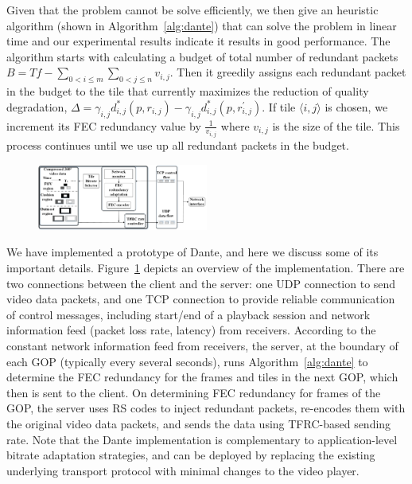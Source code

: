 Given that the problem cannot be solve efficiently, we then give 
an heuristic algorithm (shown in Algorithm~\ref{alg:dante}) that 
can solve the problem in linear time and our experimental results 
indicate it results in good performance. The algorithm starts 
with calculating a budget of total number of redundant packets 
$B=Tf-\sum_{0<i\leq m}\sum_{0<j\leq n}v_{i,j}$. Then it greedily assigns 
each redundant packet in the budget to the tile that currently 
maximizes the reduction of quality degradation, \ie 
$\Delta=\gamma_{i,j}d_{i,j}^{*}(p,r_{i,j})-\gamma_{i,j}d_{i,j}^{*}(p,r_{i,j}^{'})$. 
If tile $\langle i, j\rangle$ is chosen, we increment its FEC 
redundancy value by $\frac{1}{v_{i,j}}$ where $v_{i,j}$ is the 
size of the tile. This process continues until we use up all 
redundant packets in the budget.


\begin{figure}[t]
	\centering
	\includegraphics[width=0.5\textwidth]{paper_figs/architecture_dante_0626_v4.png}
	\vspace{-0.3cm}
	\label{fig:overview}
\end{figure}




\label{subsec:impl}


We have implemented a prototype of Dante, and here we discuss 
some of its important details. 
Figure~\ref{fig:overview} depicts an overview of the 
implementation. There are two connections between the client and 
the server: one UDP connection to send video data packets, and 
one TCP connection to provide reliable communication of control 
messages, including start/end of a playback session and network information feed (\eg packet loss rate, latency) from receivers. According to the constant network information feed from receivers, the server, at the boundary of each GOP (typically every several seconds), runs Algorithm~\ref{alg:dante} to determine the FEC 
redundancy for the frames and tiles in the next GOP, which then is sent to
 the client. On determining FEC redundancy for frames of the GOP, the server uses 
RS codes to 
inject redundant packets, re-encodes them with the original 
video data packets, and sends the data using TFRC-based sending 
rate. Note that the Dante implementation is complementary to 
application-level bitrate adaptation strategies, and can be 
deployed by replacing the existing underlying transport protocol 
with minimal changes to the video player. 

